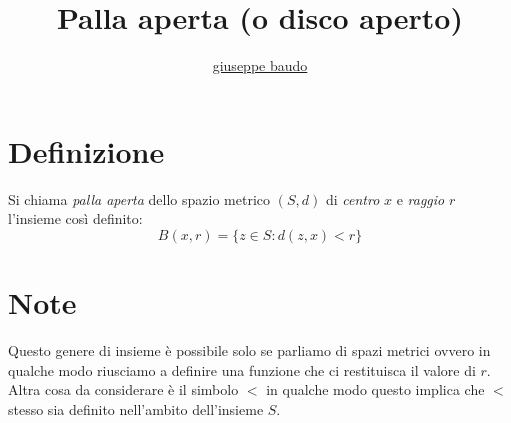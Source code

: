 \documentclass[a4paper,10pt]{article}
\title{Palla aperta (o disco aperto)}
\author{\href{http://www.baudo.hol.es}{giuseppe baudo}}
\begin{document}
\maketitle

\section{Definizione}
Si chiama \textit{palla aperta} dello spazio metrico $(S, d)$ di \textit{centro} $x$ e \textit{raggio} $r$ l'insieme così definito:
\[
B(x, r) = \{z \in S : d(z, x) < r\}
\]

\section{Note}
Questo genere di insieme è possibile solo se parliamo di spazi metrici ovvero in qualche modo riusciamo a definire una funzione che ci restituisca il valore di $r$.
Altra cosa da considerare è il simbolo $<$ in qualche modo questo implica che $<$ stesso sia definito nell'ambito dell'insieme $S$.
\end{document}
